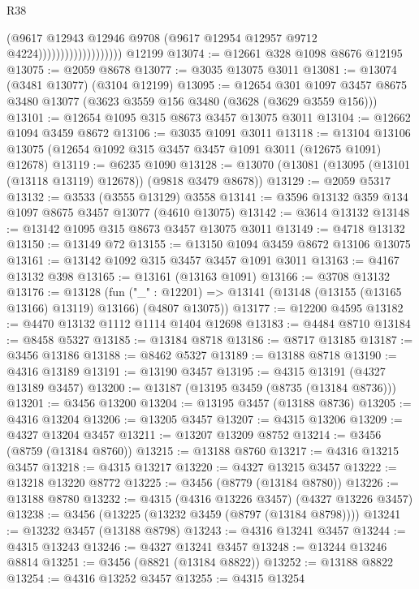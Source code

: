 \begin{lexlean}{R38}
\begin{coremodule}
                                      (@9617
                                        @12943
                                        @12946
                                        @9708
                                        (@9617 @12954 @12957 @9712 @4224)))))))))))))))))))
    @12199
@13074 := @12661 @328 @1098 @8676 @12195
@13075 := @2059 @8678
@13077 := @3035 @13075 @3011
@13081 := @13074 (@3481 @13077) (@3104 @12199)
@13095 := @12654
    @301
    @1097
    @3457
    @8675
    @3480
    @13077
    (@3623 @3559 @156 @3480 (@3628 (@3629 @3559 @156)))
@13101 := @12654 @1095 @315 @8673 @3457 @13075 @3011
@13104 := @12662 @1094 @3459 @8672
@13106 := @3035 @1091 @3011
@13118 := @13104 @13106 @13075 (@12654 @1092 @315 @3457 @3457 @1091 @3011 (@12675 @1091) @12678)
@13119 := @6235 @1090
@13128 := @13070 (@13081 (@13095 (@13101 (@13118 @13119) @12678)) (@9818 @3479 @8678))
@13129 := @2059 @5317
@13132 := @3533 (@3555 @13129) @3558
@13141 := @3596 @13132 @359 @134 @1097 @8675 @3457 @13077 (@4610 @13075)
@13142 := @3614 @13132
@13148 := @13142 @1095 @315 @8673 @3457 @13075 @3011
@13149 := @4718 @13132
@13150 := @13149 @72
@13155 := @13150 @1094 @3459 @8672 @13106 @13075
@13161 := @13142 @1092 @315 @3457 @3457 @1091 @3011
@13163 := @4167 @13132 @398
@13165 := @13161 (@13163 @1091)
@13166 := @3708 @13132
@13176 := @13128
    (fun ("_" : @12201) => @13141 (@13148 (@13155 (@13165 @13166) @13119) @13166) (@4807 @13075))
@13177 := @12200 @4595
@13182 := @4470 @13132 @1112 @1114 @1404 @12698
@13183 := @4484 @8710
@13184 := @8458 @5327
@13185 := @13184 @8718
@13186 := @8717 @13185
@13187 := @3456 @13186
@13188 := @8462 @5327
@13189 := @13188 @8718
@13190 := @4316 @13189
@13191 := @13190 @3457
@13195 := @4315 @13191 (@4327 @13189 @3457)
@13200 := @13187 (@13195 @3459 (@8735 (@13184 @8736)))
@13201 := @3456 @13200
@13204 := @13195 @3457 (@13188 @8736)
@13205 := @4316 @13204
@13206 := @13205 @3457
@13207 := @4315 @13206
@13209 := @4327 @13204 @3457
@13211 := @13207 @13209 @8752
@13214 := @3456 (@8759 (@13184 @8760))
@13215 := @13188 @8760
@13217 := @4316 @13215 @3457
@13218 := @4315 @13217
@13220 := @4327 @13215 @3457
@13222 := @13218 @13220 @8772
@13225 := @3456 (@8779 (@13184 @8780))
@13226 := @13188 @8780
@13232 := @4315 (@4316 @13226 @3457) (@4327 @13226 @3457)
@13238 := @3456 (@13225 (@13232 @3459 (@8797 (@13184 @8798))))
@13241 := @13232 @3457 (@13188 @8798)
@13243 := @4316 @13241 @3457
@13244 := @4315 @13243
@13246 := @4327 @13241 @3457
@13248 := @13244 @13246 @8814
@13251 := @3456 (@8821 (@13184 @8822))
@13252 := @13188 @8822
@13254 := @4316 @13252 @3457
@13255 := @4315 @13254

\end{coremodule}
\end{lexlean}
